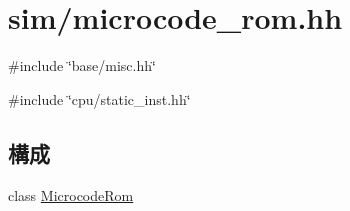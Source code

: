 \hypertarget{sim_2microcode__rom_8hh}{
\section{sim/microcode\_\-rom.hh}
\label{sim_2microcode__rom_8hh}
}
{\ttfamily \#include \char`\"{}base/misc.hh\char`\"{}}\par
{\ttfamily \#include \char`\"{}cpu/static\_\-inst.hh\char`\"{}}\par
\subsection*{構成}
\begin{DoxyCompactItemize}
\item 
class \hyperlink{classMicrocodeRom}{MicrocodeRom}
\end{DoxyCompactItemize}

